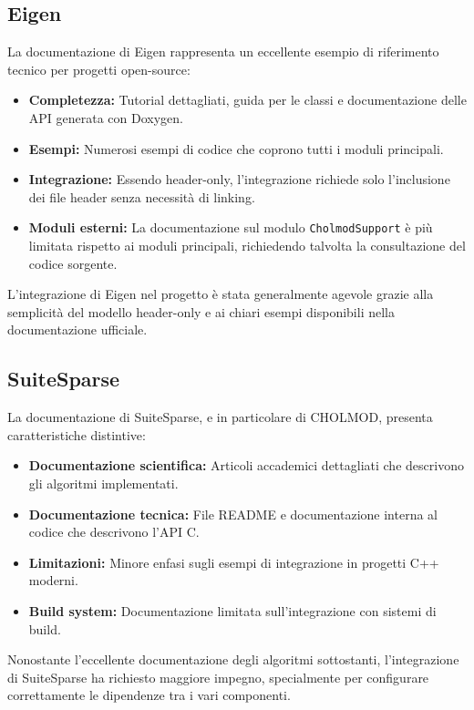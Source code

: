 \subsection{Eigen}

La documentazione di Eigen rappresenta un eccellente esempio di riferimento tecnico per progetti open-source:

\begin{itemize}
    \item \textbf{Completezza:} Tutorial dettagliati, guida per le classi e documentazione delle API generata con Doxygen.
    \item \textbf{Esempi:} Numerosi esempi di codice che coprono tutti i moduli principali.
    \item \textbf{Integrazione:} Essendo header-only, l'integrazione richiede solo l'inclusione dei file header senza necessità di linking.
    \item \textbf{Moduli esterni:} La documentazione sul modulo \texttt{CholmodSupport} è più limitata rispetto ai moduli 
    principali, richiedendo talvolta la consultazione del codice sorgente.
\end{itemize}

L'integrazione di Eigen nel progetto è stata generalmente agevole grazie alla semplicità del modello header-only e ai chiari esempi 
disponibili nella documentazione ufficiale.

\subsection{SuiteSparse}

La documentazione di SuiteSparse, e in particolare di CHOLMOD, presenta caratteristiche distintive:

\begin{itemize}
    \item \textbf{Documentazione scientifica:} Articoli accademici dettagliati che descrivono gli algoritmi implementati.
    \item \textbf{Documentazione tecnica:} File README e documentazione interna al codice che descrivono l'API C.
    \item \textbf{Limitazioni:} Minore enfasi sugli esempi di integrazione in progetti C++ moderni.
    \item \textbf{Build system:} Documentazione limitata sull'integrazione con sistemi di build.
\end{itemize}

Nonostante l'eccellente documentazione degli algoritmi sottostanti, l'integrazione di SuiteSparse ha richiesto maggiore impegno, 
specialmente per configurare correttamente le dipendenze tra i vari componenti.

